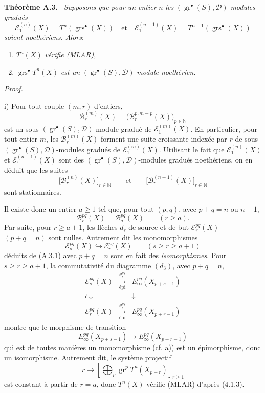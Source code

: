 \documentclass[11pt]{article}
\newenvironment{statement}[1]{\par\medskip\noindent\textbf{#1.}\ }{\par\medskip}
\newenvironment{prooftext}[1][Proof]{\par\noindent\emph{#1.}\ }{\par\medskip}
\providecommand{\gr}{\operatorname{gr}}
\providecommand{\gr}{\operatorname{gr}}
\providecommand{\gr}{\operatorname{gr}}
\providecommand{\grs}{\operatorname{grs}}
\begin{document}
\begin{statement}{Théorème A.3}
\emph{Supposons que pour un entier} \(n\) \emph{les} \((\gr^\bullet(S),\mathcal D)\)-\emph{modules gradués}
\[
\mathcal E_1^{(n)}(X)=T^n(\grs^\bullet(X))
\quad\text{et}\quad
\mathcal E_1^{(n-1)}(X)=T^{n-1}(\grs^\bullet(X))
\]
\emph{soient noethériens. Alors}:
\begin{enumerate}[label=\textup{(\roman*)}]
\item \(T^n(X)\) \emph{vérifie (MLAR)},
\item \(\grs^\bullet T^n(X)\) \emph{est un} \((\gr^\bullet(S),\mathcal D)\)-\emph{module noethérien}.
\end{enumerate}
\end{statement}

\begin{prooftext}

i) Pour tout couple \((m,r)\) d'entiers,
\[
\mathcal B_r^{(m)}(X)=\bigl(\mathcal B_r^{p,m-p}(X)\bigr)_{p\in\mathbb N}
\]
est un sous-\((\gr^\bullet(S),\mathcal D)\)-module gradué de \(\mathcal E_1^{(m)}(X)\). En particulier, pour tout entier \(m\), les \(\mathcal B_r^{(m)}(X)\) forment une suite croissante indexée par \(r\) de sous-\((\gr^\bullet(S),\mathcal D)\)-modules gradués de \(\mathcal E_1^{(m)}(X)\). Utilisant le fait que \(\mathcal E_1^{(n)}(X)\) et \(\mathcal E_1^{(n-1)}(X)\) sont des \((\gr^\bullet(S),\mathcal D)\)-modules gradués noethériens, on en déduit que les suites
\[
\bigl[\mathcal B_r^{(n)}(X)\bigr]_{r\in\mathbb N}
\qquad\text{et}\qquad
\bigl[\mathcal B_r^{(n-1)}(X)\bigr]_{r\in\mathbb N}
\]
sont stationnaires.

Il
existe donc un entier \(a\ge1\) tel que, pour tout \((p,q)\), avec \(p+q=n\) ou \(n-1\),
\begin{equation}
\mathcal B_r^{pq}(X)=\mathcal B_a^{pq}(X)\qquad(r\ge a).
\tag{A.3.1}
\end{equation}
Par suite, pour \(r\ge a+1\), les flèches \(d_r\) de source et de but \(\mathcal E_r^{pq}(X)\) \((p+q=n)\) sont nulles. Autrement dit les monomorphismes
\[
\mathcal E_s^{pq}(X)\hookrightarrow\mathcal E_r^{pq}(X)\qquad(s\ge r\ge a+1)
\]
déduits de (A.3.1) avec \(p+q=n\) sont en fait des \emph{isomorphismes}. Pour \(s\ge r\ge a+1\), la commutativité du diagramme \((d_3)\), avec \(p+q=n\),
\[
\begin{array}{ccc}
\mathcal E_s^{pq}(X)&\xrightarrow[\text{épi}]{\theta_s^{pq}}&E_\infty^{pq}(X_{p+s-1})\\
\wr\downarrow&&\downarrow\\
\mathcal E_r^{pq}(X)&\xrightarrow[\text{épi}]{\theta_r^{pq}}&E_\infty^{pq}(X_{p+r-1})
\end{array}
\]
montre que le morphisme de transition
\[
E_\infty^{pq}(X_{p+s-1})\longrightarrow E_\infty^{pq}(X_{p+r-1})
\]
qui est de toutes manières un monomorphisme (cf. a)) est un épimorphisme, donc un isomorphisme. Autrement dit, le système projectif
\[
r\longrightarrow\left[\bigoplus_p\gr^p T^n(X_{p+r})\right]_{r\ge1}
\]
est constant à partir de \(r=a\), donc \(T^n(X)\) vérifie (MLAR) d'après (4.1.3).


\end{prooftext}
\end{document}
